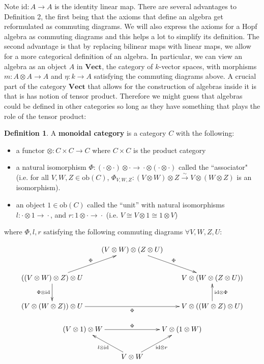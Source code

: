 \documentclass[11pt]{article}
\newcommand{\nt}{\noindent}
\newcommand{\rt}{\xrightarrow{}}
\newcommand{\xrt}{\xrightarrow}
\newcommand{\cd}{\cdot}
\newcommand{\id}{\text{id}}
\newcommand{\ob}{\text{ob}}
\newcommand{\Vect}{\textbf{Vect}}
\newcommand{\define}[1]{\textbf{#1}}
\theoremstyle{definition}
\newtheorem{definition}[lemma]{Definition}
\begin{document}
\nt Note $\id:A\rt A$ is the identity linear map. There are several advantages to Definition 2, the first being that the axioms that define an algebra get reformulated as commuting diagrams. We will also express the axioms for a Hopf algebra as commuting diagrams and this helps a lot to simplify its definition. The second advantage is that by replacing bilinear maps with linear maps, we allow for a more categorical definition of an algebra. In particular, we can view an algebra as an object $A$ in $\Vect$, the category of $k$-vector spaces, with morphisms $m:A\otimes A\rt A$ and $\eta:k\rt A$ satisfying the commuting diagrams above. A crucial part of the category $\Vect$ that allows for the construction of algebras inside it is that is has notion of tensor product. Therefore we might guess that algebras could be defined in other categories so long as they have something that plays the role of the tensor product:

\begin{definition}A \define{monoidal category} is a category $C$ with the following:\begin{itemize}
  \item a functor $\otimes :C\times C\rt C$ where $C\times C$ is the product category
  \item a natural isomorphism $\Phi:(\cd \otimes \cd)\otimes \cd \rt \cd \otimes (\cd \otimes \cd)$ called the ``associator" (i.e. for all $V,W,Z\in \ob(C)$, $\Phi_{V,W,Z}:(V\otimes W)\otimes Z\xrt{\sim} V\otimes (W\otimes Z)$ is an isomorphism).
  \item an object $1\in \ob(C)$ called the ``unit'' with natural isomorphisms $l:\cd \otimes 1\rt \cd$, and $r:1\otimes \cd \rt \cd $ (i.e. $V\cong V\otimes 1\cong 1\otimes V$) 
\end{itemize}
where $\Phi, l,r$ satisfying the following commuting diagrams $\forall V,W,Z,U$:
\begin{useimager}
$$\xymatrix@C=2em{
 & (V\otimes W)\otimes (Z\otimes U) \ar[rd]^\Phi & \\
((V\otimes W)\otimes Z)\otimes U \ar[ru]^{\Phi} \ar[d]_{\Phi\otimes \id} & & V\otimes (W\otimes (Z\otimes U))\\
(V\otimes (W\otimes Z))\otimes U \ar[rr]_\Phi & & V\otimes((W\otimes Z)\otimes U) \ar[u]_{\id \otimes \Phi}
}
$$
\end{useimager}
\begin{useimager}
$$\xymatrix@C=2em{
  (V\otimes 1)\otimes W \ar[rr]^\Phi && V\otimes (1\otimes W)\\
  & V\otimes W \ar[lu]^{l\otimes \id} \ar[ru]_{\id \otimes r} & \\
}$$  
\end{useimager}
\end{definition}
\end{document}
